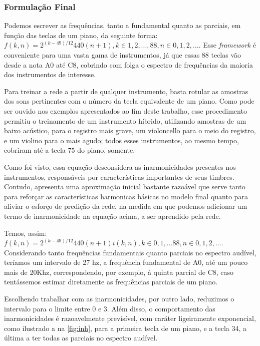 \documentclass[]{article}
\begin{document}
\hypertarget{formulauxe7uxe3o-final}{%
\subsubsection{Formulação Final}\label{formulauxe7uxe3o-final}}

Podemos escrever as frequências, tanto a fundamental quanto as parciais,
em função das teclas de um piano, da seguinte forma:
\(f(k,n)=2^{(k-49)/12}440(n+1), k \in {1, 2,...,88}, n \in {0,1,2,...}\).
Esse \emph{framework} é conveniente para uma vasta gama de instrumentos,
já que essas 88 teclas vão desde a nota A0 até C8, cobrindo com folga o
espectro de frequências da maioria dos instrumentos de interesse.

Para treinar a rede a partir de qualquer instrumento, basta rotular as
amostras dos sons pertinentes com o número da tecla equivalente de um
piano. Como pode ser ouvido nos exemplos apresentados ao fim deste
trabalho, esse procedimento permitiu o treinamento de um instrumento
híbrido, utilizando amostras de um baixo acústico, para o registro mais
grave, um violoncello para o meio do registro, e um violino para o mais
agudo; todos esses instrumentos, ao mesmo tempo, cobriram até a tecla 75
do piano, somente.

Como foi visto, essa equação desconsidera as inarmonicidades presentes
nos instrumentos, responsáveis por características importantes de seus
timbres. Contudo, apresenta uma aproximação inicial bastante razoável
que serve tanto para reforçar as características harmonicas básicas no
modelo final quanto para aliviar o esforço de predição da rede, na
medida em que podemos adicionar um termo de inarmonicidade na equação
acima, a ser aprendido pela rede.

Temos, assim:
\(f(k,n)=2^{(k-49)/12}440(n+1)i(k,n), k \in {0,1,...88}, n \in {0,1,2,...}\).
Considerando tanto frequências fundamentais quanto parciais no espectro
audível, teríamos um intervalo de 27 hz, a frequência fundamental de A0,
até um pouco mais de 20Khz, correspondendo, por exemplo, à quinta
parcial de C8, caso tentássemos estimar diretamente as frequências
parciais de um piano.

Escolhendo trabalhar com as inarmonicidades, por outro lado, reduzimos o
intervalo para o limite entre 0 e 3. Além disso, o comportamento das
inarmonicidades é razoavelmente previsível, com caráter ligeiramente
exponencial, como ilustrado a na \cref{fig:inh}, para a
primeira tecla de um piano, e a tecla 34, a última a ter todas as
parciais no espectro audível.
\end{document}
